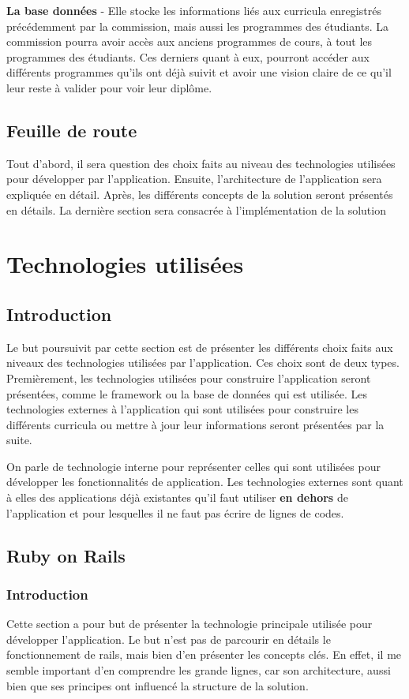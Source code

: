 \textbf{La base données} - Elle stocke les informations liés aux curricula enregistrés précédemment par la commission, mais aussi les programmes des étudiants. La commission pourra avoir accès aux anciens programmes de cours, à tout les programmes des étudiants. Ces derniers quant à eux, pourront accéder aux différents programmes qu'ils ont déjà suivit et avoir une vision claire de ce qu'il leur reste à valider pour voir leur diplôme.

\subsection{Feuille de route}
Tout d'abord, il sera question des choix faits au niveau des technologies utilisées pour développer par l'application. Ensuite, l'architecture de l'application sera expliquée en détail. Après, les différents concepts de la solution seront présentés en détails. La dernière section sera consacrée à l'implémentation de la solution
\clearpage

\section{Technologies utilisées}
\subsection{Introduction}
Le but poursuivit par cette section est de présenter les différents choix faits aux niveaux des technologies utilisées par l'application. Ces choix sont de deux types. Premièrement, les technologies utilisées pour construire l'application seront présentées, comme le framework ou la base de données qui est utilisée. Les technologies externes à l'application qui sont utilisées pour construire les différents curricula ou mettre à jour leur informations seront présentées par la suite.

On parle de technologie interne pour représenter celles qui sont utilisées pour développer les fonctionnalités de application. Les technologies externes sont quant à elles des applications déjà existantes qu'il faut utiliser \textbf{en dehors} de l'application et pour lesquelles il ne faut pas écrire de lignes de codes.
\subsection{Ruby on Rails}
\subsubsection{Introduction}
Cette section a pour but de présenter la technologie principale utilisée pour développer l'application. Le but n'est pas de parcourir en détails le fonctionnement de rails, mais bien d'en présenter les concepts clés. En effet, il me semble important d'en comprendre les grande lignes, car son architecture, aussi bien que ses principes ont influencé la structure de la solution.
